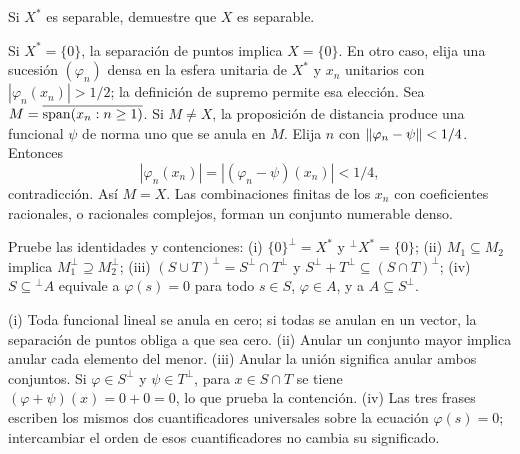 \begin{ejercicio}\label{ej:v3-l02-1}
Si $X^*$ es separable, demuestre que $X$ es separable.
\end{ejercicio}
\begin{solucion}
Si $X^*=\{0\}$, la separación de puntos implica $X=\{0\}$. En otro caso, elija una sucesión $(\varphi_n)$ densa en la esfera unitaria de $X^*$ y $x_n$ unitarios con $|\varphi_n(x_n)|>1/2$; la definición de supremo permite esa elección. Sea $M=\overline{\operatorname{span}(x_n:n\geq1)}$. Si $M\ne X$, la proposición de distancia produce una funcional $\psi$ de norma uno que se anula en $M$. Elija $n$ con $\left\lVert\varphi_n-\psi\right\rVert<1/4$. Entonces
\[
 |\varphi_n(x_n)|=|(\varphi_n-\psi)(x_n)|<1/4,
\]
contradicción. Así $M=X$. Las combinaciones finitas de los $x_n$ con coeficientes racionales, o racionales complejos, forman un conjunto numerable denso.
\end{solucion}

\begin{ejercicio}\label{ej:v3-l02-2}
Pruebe las identidades y contenciones: (i) $\{0\}^\perp=X^*$ y ${}^\perp X^*=\{0\}$; (ii) $M_1\subseteq M_2$ implica $M_1^\perp\supseteq M_2^\perp$; (iii) $(S\cup T)^\perp=S^\perp\cap T^\perp$ y $S^\perp+T^\perp\subseteq(S\cap T)^\perp$; (iv) $S\subseteq{}^\perp A$ equivale a $\varphi(s)=0$ para todo $s\in S$, $\varphi\in A$, y a $A\subseteq S^\perp$.
\end{ejercicio}
\begin{solucion}
(i) Toda funcional lineal se anula en cero; si todas se anulan en un vector, la separación de puntos obliga a que sea cero. (ii) Anular un conjunto mayor implica anular cada elemento del menor. (iii) Anular la unión significa anular ambos conjuntos. Si $\varphi\in S^\perp$ y $\psi\in T^\perp$, para $x\in S\cap T$ se tiene $(\varphi+\psi)(x)=0+0=0$, lo que prueba la contención. (iv) Las tres frases escriben los mismos dos cuantificadores universales sobre la ecuación $\varphi(s)=0$; intercambiar el orden de esos cuantificadores no cambia su significado.
\end{solucion}

